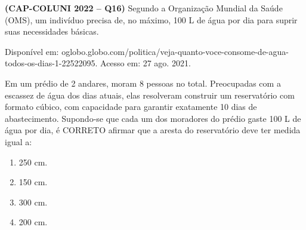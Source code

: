 \textbf{(CAP-COLUNI 2022 -- Q16)} Segundo a Organização Mundial da Saúde (OMS), um indivíduo precisa de, no máximo, 100 L de água por dia para suprir suas necessidades básicas.

Disponível em: oglobo.globo.com/politica/veja-quanto-voce-consome-de-agua-todos-os-dias-1-22522095. Acesso em: 27 ago. 2021.

Em um prédio de 2 andares, moram 8 pessoas no total. Preocupadas com a escassez de água dos dias atuais, elas resolveram construir um reservatório com formato cúbico, com capacidade para garantir exatamente 10 dias de abastecimento. Supondo-se que cada um dos moradores do prédio gaste 100 L de água por dia, é CORRETO afirmar que a aresta do reservatório deve ter medida igual a:

\begin{enumerate}
	\item 250 cm.
	\item 150 cm.
	\item 300 cm.
	\item 200 cm.
\end{enumerate}
